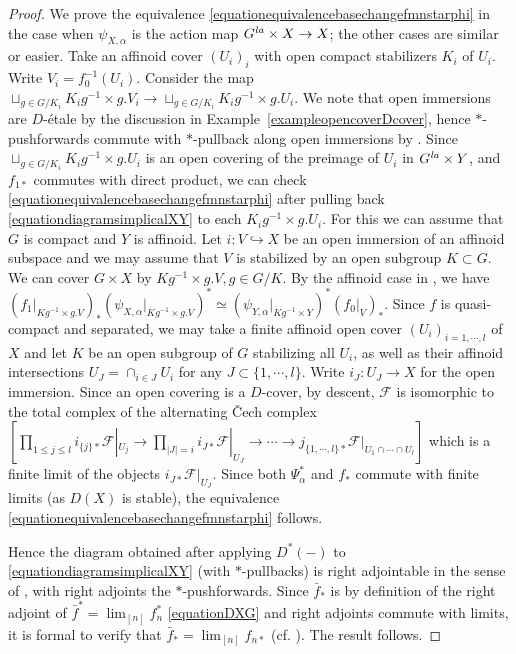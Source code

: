 \documentclass[a4paper,10pt]{amsart}
\theoremstyle{remark}
\theoremstyle{definition}
\theoremstyle{plain}
\numberwithin{equation}{section}
\newcommand{\calF}{{\mathcal F}}
\newcommand{\la}{{\it la}}
\begin{document}
\begin{proof}
	We prove the equivalence \eqref{equationequivalencebasechangefmnstarphi} in the case when $\psi_{X,\alpha}$ is the action map $G^{\la}\times X\rightarrow X$; the other cases are similar or easier. Take an affinoid cover $(U_i)_{i}$ with open compact stabilizers $K_i$ of $U_i$. Write $V_i=f_0^{-1}(U_i)$. Consider the map $\sqcup_{g\in G/K_i} K_ig^{-1}\times g.V_i \rightarrow \sqcup_{g\in G/K_i} K_ig^{-1}\times g.U_i$. We note that open immersions are $D$-\'etale by the discussion in Example~\ref{exampleopencoverDcover}, hence $*$-pushforwards commute with $*$-pullback along open immersions by \cite[Lem.~4.5.13]{heyer20246functor}. Since $ \sqcup_{g\in G/K_i} K_ig^{-1}\times g.U_i$ is an open covering of the preimage of $U_i$ in $G^{\la}\times Y$, and $f_{1*}$ commutes with direct product, we can check \eqref{equationequivalencebasechangefmnstarphi} after pulling back \eqref{equationdiagramsimplicalXY} to each $K_ig^{-1}\times g.U_i$. For this we can assume that $G$ is compact and $Y$ is affinoid. Let $i:V\hookrightarrow X$ be an open immersion of an affinoid subspace and we may assume that $V$ is stabilized by an open subgroup $K\subset G$. We can cover $G\times X$ by $Kg^{-1}\times g.V,g\in G/K$. By the affinoid case in \cite[Cor.~2.42]{mikami2026finiteness}, we have $(f_{1}|_{Kg^{-1}\times g.V})_*(\psi_{X,\alpha}|_{Kg^{-1}\times g.V})^*\simeq (\psi_{Y,\alpha}|_{Kg^{-1}\times Y})^*(f_{0}|_{V})_*$. Since $f$ is quasi-compact and separated, we may take a finite affinoid open cover $(U_i)_{i=1,\cdots,l}$ of $X$ and let $K$ be an open subgroup of $G$ stabilizing all $U_i$, as well as their affinoid intersections $U_J=\cap_{i\in J}U_{i}$ for any $J\subset \{1,\cdots,l\}$. Write $i_{J}:U_J\rightarrow X$ for the open immersion. Since an open covering is a $D$-cover, by descent, $\calF$ is isomorphic to the total complex of the alternating \v{C}ech complex  $[\prod_{1\leq j\leq l}i_{\{j\}*}\calF|_{U_j}\rightarrow \prod_{|J|=i}i_{J*}\calF|_{U_J}\rightarrow \cdots \rightarrow j_{\{1,\cdots,l\}*}\calF|_{U_1\cap\cdots \cap U_{l}}]$ which is a finite limit of the objects $i_{J*}\calF|_{U_J}$. Since both $\Psi_{\alpha}^*$ and $f_*$ commute with finite limits (as $D(X)$ is stable), the equivalence \eqref{equationequivalencebasechangefmnstarphi} follows.

	Hence the diagram obtained after applying $D^*(-)$ to \eqref{equationdiagramsimplicalXY} (with $*$-pullbacks) is right adjointable in the sense of \cite[Def.~4.7.4.13]{lurie2017higher}, with right adjoints the $*$-pushforwards. Since $\bar f_*$ is by definition of the right adjoint of $\bar f^*=\lim_{[n]}f_n^*$ \eqref{equationDXG} and right adjoints commute with limits, it is formal to verify that $\bar f_*=\lim_{[n]}f_{n*}$ (cf. \cite[Cor.~4.7.4.18]{lurie2017higher}). The result follows.
\end{proof}
\end{document}
